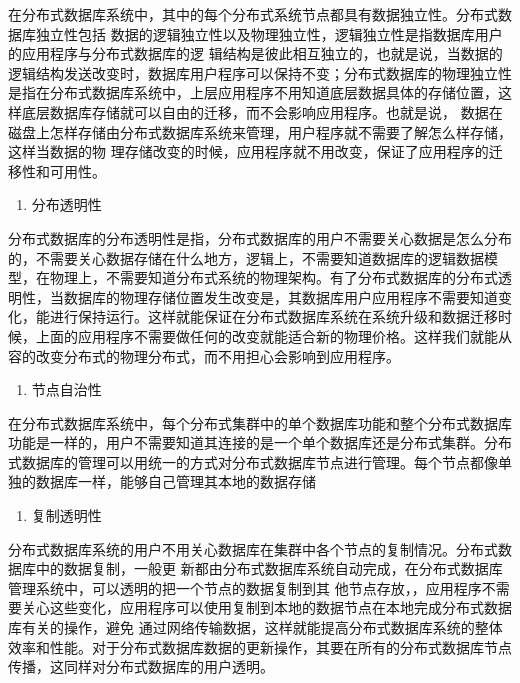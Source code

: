	在分布式数据库系统中，其中的每个分布式系统节点都具有数据独立性。分布式数据库独立性包括
	数据的逻辑独立性以及物理独立性，逻辑独立性是指数据库用户的应用程序与分布式数据库的逻
	辑结构是彼此相互独立的，也就是说，当数据的逻辑结构发送改变时，数据库用户程序可以保持不变；分布式数据库的物理独立性是指在分布式数据库系统中，上层应用程序不用知道底层数据具体的存储位置，这样底层数据库存储就可以自由的迁移，而不会影响应用程序。也就是说，
	数据在磁盘上怎样存储由分布式数据库系统来管理，用户程序就不需要了解怎么样存储，这样当数据的物
	理存储改变的时候，应用程序就不用改变，保证了应用程序的迁移性和可用性。
	

	\begin{enumerate}[resume]
		\item 分布透明性
	\end{enumerate}

	分布式数据库的分布透明性是指，分布式数据库的用户不需要关心数据是怎么分布的，不需要关心数据存储在什么地方，逻辑上，不需要知道数据库的逻辑数据模型，在物理上，不需要知道分布式系统的物理架构。有了分布式数据库的分布式透明性，当数据库的物理存储位置发生改变是，其数据库用户应用程序不需要知道变化，能进行保持运行。这样就能保证在分布式数据库系统在系统升级和数据迁移时候，上面的应用程序不需要做任何的改变就能适合新的物理价格。这样我们就能从容的改变分布式的物理分布式，而不用担心会影响到应用程序。

	\begin{enumerate}[resume]
		\item 节点自治性
	\end{enumerate}

	在分布式数据库系统中，每个分布式集群中的单个数据库功能和整个分布式数据库功能是一样的，用户不需要知道其连接的是一个单个数据库还是分布式集群。分布式数据库的管理可以用统一的方式对分布式数据库节点进行管理。每个节点都像单独的数据库一样，能够自己管理其本地的数据存储

	\begin{enumerate}[resume]
		\item 复制透明性
	\end{enumerate}

	分布式数据库系统的用户不用关心数据库在集群中各个节点的复制情况。分布式数据库中的数据复制，一般更
	新都由分布式数据库系统自动完成，在分布式数据库管理系统中，可以透明的把一个节点的数据复制到其
	他节点存放，，应用程序不需要关心这些变化，应用程序可以使用复制到本地的数据节点在本地完成分布式数据库有关的操作，避免
	通过网络传输数据，这样就能提高分布式数据库系统的整体效率和性能。对于分布式数据库数据的更新操作，其要在所有的分布式数据库节点传播，这同样对分布式数据库的用户透明。


